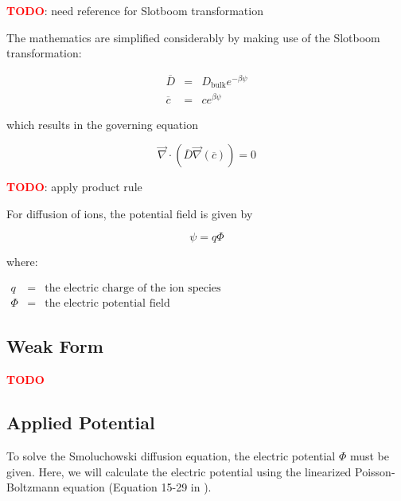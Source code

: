 \textcolor{red}{\textbf{TODO}}: need reference for Slotboom transformation

The mathematics are simplified considerably by making use of the Slotboom transformation:

\begin{equation}
\begin{array}{rcl}
\overline{D} & = & D_{\mathrm{bulk}} e^{-\beta \psi} \\
\overline{c} & = & c e^{\beta \psi}
\end{array}
\end{equation}

which results in the governing equation

\begin{equation}
\vec{\nabla} \cdot \left( \overline{D} \vec{\nabla} \left( \overline{c} \right) \right) = 0
\end{equation}


\textcolor{red}{\textbf{TODO}}: apply product rule

For diffusion of ions, the potential field is given by

\begin{equation}
\psi=q \Phi
\end{equation}

where:

$\begin{array}{rcl}
q & = & \text{the electric charge of the ion species} \\
\Phi & = & \text{the electric potential field}
\end{array}$

\subsection{Weak Form}\label{subsec:unhom_smol_weak}

\textcolor{red}{\textbf{TODO}}

\subsection{Applied Potential}\label{subsec:unhom_smol_potential}

To solve the Smoluchowski diffusion equation, the electric potential $\Phi$ must be given.
Here, we will calculate the electric potential using the linearized Poisson-Boltzmann equation
(Equation 15-29 in \cite{McQuarrie-StatMech}).

